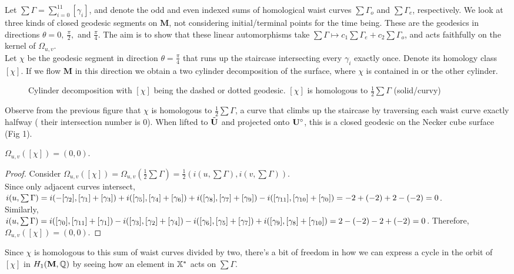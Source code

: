 \documentclass[a4paper, 11pt]{article}
\def\bM{\mathbf{M}}
\begin{document}
\noindent Let $\sum\Gamma=\sum_{i=0}^{11}[\gamma_i]$, and denote the odd and even indexed sums of homological waist curves $\sum\Gamma_o$ and $\sum\Gamma_e$, respectively. We look at three kinds of closed geodesic segments on $\bM$, not considering initial/terminal points for the time being. These are the geodesics in directions $\theta=0,~\frac{\pi}{2},$ and $\frac{\pi}{4}$. The aim is to show that these linear automorphisms take $\sum\Gamma\mapsto c_1\sum\Gamma_e+c_2\sum\Gamma_o$, and acts faithfully on the kernel of $\Omega_{u,v}$. \\



\noindent Let $\chi$ be the geodesic segment in direction $\theta=\frac{\pi}{4}$ that runs up the staircase intersecting every $\gamma_i$ exactly once. Denote its homology class $[\chi]$. If we flow $\bM$ in this direction we obtain a two cylinder decomposition of the surface, where $\chi$ is contained in or the other cylinder.
\begin{figure}[H]
\centering

\caption{Cylinder decomposition with $[\chi]$ being the dashed or dotted geodesic. $[\chi]$ is homologous to $\frac{1}{2}\sum\Gamma$ (solid/curvy)}
\end{figure}
Observe from the previous figure that $\chi$ is homologous to $\frac{1}{2}\sum\Gamma$, a curve that climbs up the staircase by traversing each waist curve exactly halfway ( their intersection number is 0). When lifted to $\tilde{\mathbf{U}}$ and projected onto $\mathbf{U}^\circ$, this is a closed geodesic on the Necker cube surface (Fig 1).


\begin{lem}
$\Omega_{u,v}([\chi])=(0,0).$
\begin{proof}
Consider $\Omega_{u,v}([\chi])=\Omega_{u,v}(\frac{1}{2}\sum\Gamma)=\frac{1}{2}(i(u,\sum\Gamma),i(v,\sum\Gamma))$. \\Since only adjacent curves intersect,\\ $i(u,\sum\Gamma)=i(-[\gamma_2],[\gamma_{1}]+[\gamma_{3}]) +i([\gamma_5],[\gamma_{4}]+[\gamma_{6}]) + i([\gamma_8],[\gamma_{7}]+[\gamma_{9}]) - i([\gamma_{11}],[\gamma_{10}]+[\gamma_{0}])\\=-2+(-2)+2-(-2)=0$.\\
Similarly,\\ $i(u,\sum\Gamma)=i([\gamma_0],[\gamma_{11}]+[\gamma_{1}]) -i([\gamma_3],[\gamma_{2}]+[\gamma_{4}]) -i([\gamma_6],[\gamma_{5}]+[\gamma_{7}]) +i([\gamma_9],[\gamma_{8}]+[\gamma_{10}])\\=2-(-2)-2+(-2)=0$. Therefore, $\Omega_{u,v}([\chi])=(0,0)$.
\end{proof}
\end{lem} 
Since $\chi$ is homologous to this sum of waist curves divided by two, there's a bit of freedom in how we can express a cycle in the orbit of $[\chi]$ in $H_1(\bM,\QQ)$ by seeing how an element in $\mathbb{X}^*$ acts on $\sum\Gamma$.
\end{document}
